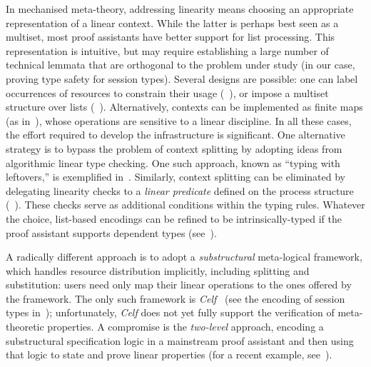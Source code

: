 \documentclass[runningheads]{llncs}
\begin{document}
In mechanised meta-theory, addressing linearity means choosing an appropriate
representation of a linear context.  While the latter  is perhaps
best seen as a multiset, most proof assistants have better support for list
processing.  This representation is intuitive, but may require
establishing a large number of technical lemmata that are orthogonal to the
problem under study (in our case, proving type safety for session types).
Several designs are possible: one can label
occurrences of resources to constrain their usage (\eg~\cite{CicconeP20}), or impose a multiset structure over lists
(\eg~\cite{Danielsson12,ChaudhuriLR19}). Alternatively, contexts can be
implemented as finite maps (as in~\cite{Castro2020}), whose operations are
sensitive to a linear discipline. In all these cases, the effort required to
develop the infrastructure is significant.
One alternative strategy is to bypass the problem of context splitting
by adopting ideas from algorithmic linear type checking. One such
approach, known as ``typing with leftovers,'' is exemplified
in~\cite{DBLP:conf/forte/ZalakainD21}.
Similarly, context splitting can be eliminated by delegating linearity checks to a
\emph{linear predicate} defined on the process structure (\eg~\cite{BP23}).
These checks serve as additional conditions within the typing rules.
Whatever the choice, list-based encodings can be refined to be intrinsically-typed if the
proof assistant supports dependent types
(see~\cite{Thiemann2019,CicconeP20,RouvoetPKV20}).

A radically different approach is to adopt a \emph{substructural}
meta-logical framework, which handles resource
distribution implicitly, including splitting and
substitution: users need only map their linear operations to the
ones offered by the framework.  The only such framework is
\emph{Celf}~\cite{Schack-Nielsen:IJCAR08} (see the encoding of session
types in~\cite{Bock2016}); unfortunately, \emph{Celf} does not yet
fully support the verification of meta-theoretic properties.  A
compromise is the \emph{two-level} approach, \ie encoding a
substructural specification logic in a mainstream proof assistant and
then using that logic to state and prove linear properties (for a
recent example, see~\cite{Felty:MSCS21}). 
\end{document}
